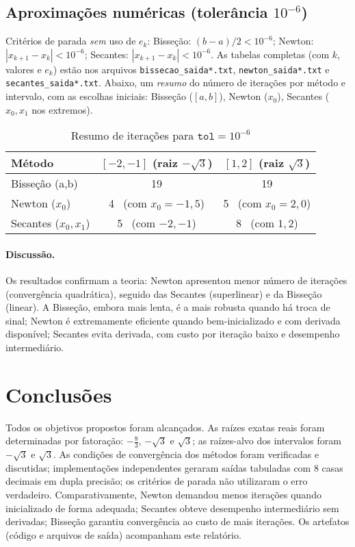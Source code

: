 \documentclass[12pt,a4paper]{article}
\begin{document}
\subsection{Aproximações numéricas (tolerância $10^{-6}$)}
Critérios de parada \emph{sem} uso de $e_k$:
Bisseção: $(b-a)/2<10^{-6}$; Newton: $|x_{k+1}-x_k|<10^{-6}$; Secantes: $|x_{k+1}-x_k|<10^{-6}$.
As tabelas completas (com $k$, valores e $e_k$) estão nos arquivos \texttt{bissecao\_saida*.txt}, \texttt{newton\_saida*.txt} e
\texttt{secantes\_saida*.txt}. Abaixo, um \emph{resumo} do número de iterações por método e intervalo, com as escolhas iniciais:
Bisseção ($[a,b]$), Newton ($x_0$), Secantes ($x_0,x_1$ nos extremos).

\begin{table}[H]
\centering
\caption{Resumo de iterações para $\texttt{tol}=10^{-6}$}
\label{tab:resumo}
\begin{tabular}{lcc}
\toprule
Método & $[-2,-1]$ (raiz $-\sqrt{3}$) & $[1,2]$ (raiz $\sqrt{3}$) \\
\midrule
Bisseção (a,b) & 19 & 19 \\
Newton ($x_0$) & 4 \, (com $x_0=-1{,}5$) & 5 \, (com $x_0=2{,}0$) \\
Secantes ($x_0,x_1$) & 5 \, (com $-2,-1$) & 8 \, (com $1,2$) \\
\bottomrule
\end{tabular}
\end{table}

\paragraph{Discussão.}
Os resultados confirmam a teoria: Newton apresentou menor número de iterações (convergência quadrática), seguido das Secantes
(superlinear) e da Bisseção (linear). A Bisseção, embora mais lenta, é a mais robusta quando há troca de sinal;
Newton é extremamente eficiente quando bem-inicializado e com derivada disponível; Secantes evita derivada, com custo por iteração
baixo e desempenho intermediário.

\section{Conclusões}
Todos os objetivos propostos foram alcançados.
As raízes exatas reais foram determinadas por fatoração: $-\tfrac{8}{3}$, $-\sqrt{3}$ e $\sqrt{3}$; as raízes-alvo dos intervalos
foram $-\sqrt{3}$ e $\sqrt{3}$.
As condições de convergência dos métodos foram verificadas e discutidas; implementações independentes geraram saídas tabuladas
com 8 casas decimais em dupla precisão; os critérios de parada não utilizaram o erro verdadeiro.
Comparativamente, Newton demandou menos iterações quando inicializado de forma adequada; Secantes obteve desempenho intermediário
sem derivadas; Bisseção garantiu convergência ao custo de mais iterações.
Os artefatos (código e arquivos de saída) acompanham este relatório.
\end{document}
